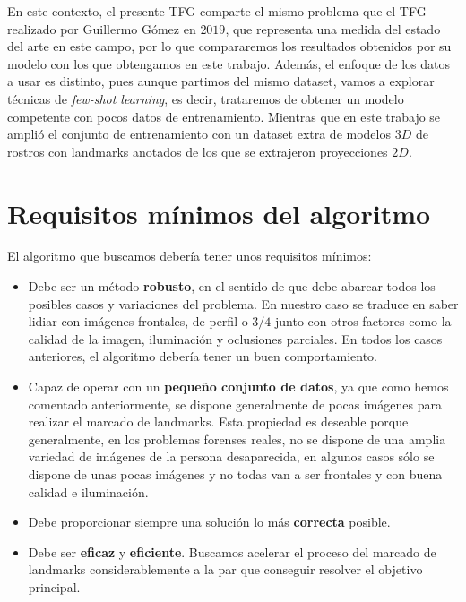     \medskip

    \noindent En este contexto, el presente TFG comparte el mismo problema que el TFG realizado por Guillermo Gómez en $2019$, que representa una medida del estado del arte en este campo, por lo que compararemos los resultados obtenidos por su modelo con los que obtengamos en este trabajo. Además, el enfoque de los datos a usar es distinto, pues aunque partimos del mismo dataset, vamos a explorar técnicas de \textit{few-shot learning}, es decir, trataremos de obtener un modelo competente con pocos datos de entrenamiento. Mientras que en este trabajo se amplió el conjunto de entrenamiento con un dataset extra de modelos $3D$ de rostros con landmarks anotados de los que se extrajeron proyecciones $2D$.

\section{Requisitos mínimos del algoritmo}

\noindent El algoritmo que buscamos debería tener unos requisitos mínimos: 

\begin{itemize}
    \item Debe ser un método \textbf{robusto}, en el sentido de que debe abarcar todos los posibles casos y variaciones del problema. En nuestro caso se traduce en saber lidiar con imágenes frontales, de perfil o $3/4$ junto con otros factores como la calidad de la imagen, iluminación y oclusiones parciales. En todos los casos anteriores, el algoritmo debería tener un buen comportamiento.
    \item Capaz de operar con un \textbf{pequeño conjunto de datos}, ya que como hemos comentado anteriormente, se dispone generalmente de pocas imágenes para realizar el marcado de landmarks. Esta propiedad es deseable porque generalmente, en los problemas forenses reales, no se dispone de una amplia variedad de imágenes de la persona desaparecida, en algunos casos sólo se dispone de unas pocas imágenes y no todas van a ser frontales y con buena calidad e iluminación.

    \item Debe proporcionar siempre una solución lo más \textbf{correcta} posible.  
    
    \item Debe ser \textbf{eficaz} y \textbf{eficiente}. Buscamos acelerar el proceso del marcado de landmarks considerablemente a la par que conseguir resolver el objetivo principal.
\end{itemize}

